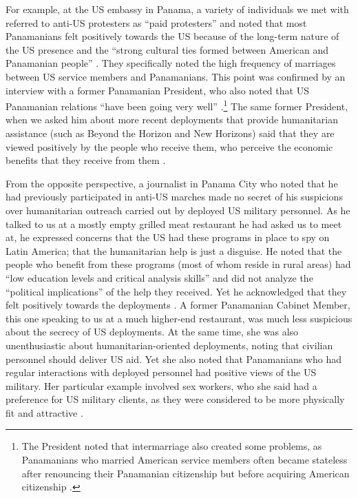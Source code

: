 For example, at the US embassy in Panama, a variety of individuals we met with referred to anti-US protesters as ``paid protesters'' and noted that most Panamanians felt positively towards the US because  of the long-term nature of the US presence and the ``strong cultural ties formed between American and Panamanian people'' \cite{embone20180712}. They specifically noted the high frequency of marriages between US service members and Panamanians. This point was confirmed by an interview with a former Panamanian President, who also noted that US Panamanian relations ``have been going very well'' \cite{embthree20180712,pres20180714}.\footnote{The President noted that intermarriage also created some problems, as Panamanians who married American service members often became stateless after renouncing their Panamanian citizenship but before acquiring American citizenship \cite{pres20180714}.} The same former President, when we asked him about more recent deployments that provide humanitarian assistance (such as Beyond the Horizon and New Horizons) said that they are viewed positively by the people who receive them, who perceive the economic benefits that they receive from them \cite{pres20180714}.

From the opposite perspective, a journalist in Panama City who noted that he had previously participated in anti-US marches made no secret of his suspicions over humanitarian outreach carried out by deployed US military personnel. As he talked to us at a mostly empty grilled meat restaurant he had asked us to meet at, he expressed concerns that the US had these programs in place to spy on Latin America; that the humanitarian help is just a disguise. He noted that the people who benefit from these programs (most of whom reside in rural areas) had ``low education levels and critical analysis skills'' and did not analyze the ``political implications'' of the help they received. Yet he acknowledged that they felt positively towards the deployments \cite{journ20180713}. A former Panamanian Cabinet Member, this one speaking to us at a much higher-end restaurant, was much less suspicious about the secrecy of US deployments. At the same time, she was also unenthusiastic about humanitarian-oriented deployments, noting that civilian personnel should deliver US aid. Yet she also noted that Panamanians who had regular interactions with deployed personnel had positive views of the US military. Her particular example involved sex workers, who she said had a preference for US military clients, as they were considered to be more physically fit and attractive \cite{journ20180712}. 


